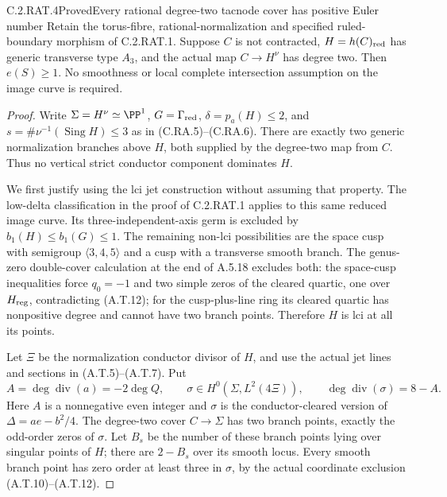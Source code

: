 \begin{statement}{C.2.RAT.4}{Proved}{Every rational degree-two tacnode cover has positive Euler number}
Retain the torus-fibre, rational-normalization and specified
ruled-boundary morphism of C.2.RAT.1. Suppose $C$ is not
contracted, $H=h(C)_{\rm red}$ has generic transverse type
$A_3$, and the actual map $C\to H^\nu$ has degree two.
Then $e(S)\ge1$. No smoothness or local complete intersection
assumption on the image curve is required.
\end{statement}
\begin{proof}
Write $\Sigma=H^\nu\simeq\PP^1$, $G=\Gamma_{\rm red}$,
$\delta=p_a(H)\le2$, and
$s=\#\nu^{-1}(\operatorname{Sing}H)\le3$ as in
(C.RA.5)--(C.RA.6). There are exactly two generic
normalization branches above $H$, both supplied by the
degree-two map from $C$. Thus no vertical strict conductor
component dominates $H$.

We first justify using the lci jet construction without
assuming that property. The low-delta classification in the
proof of C.2.RAT.1 applies to this same reduced image curve.
Its three-independent-axis germ is excluded by
$b_1(H)\le b_1(G)\le1$. The remaining non-lci possibilities
are the space cusp with semigroup $\langle3,4,5\rangle$
and a cusp with a transverse smooth branch. The
genus-zero double-cover calculation at the end of A.5.18
excludes both: the space-cusp inequalities force
$q_0=-1$ and two simple zeros of the cleared quartic,
one over $H_{\rm reg}$, contradicting (A.T.12); for the
cusp-plus-line ring its cleared quartic has nonpositive
degree and cannot have two branch points. Therefore $H$
is lci at all its points.

Let $\Xi$ be the normalization conductor divisor of $H$,
and use the actual jet lines and sections in
(A.T.5)--(A.T.7). Put
\[
 A=\deg\operatorname{div}(a)=-2\deg Q,\qquad
 \sigma\in H^0(\Sigma,L^2(4\Xi)),\qquad
 \deg\operatorname{div}(\sigma)=8-A.
\tag{C.RA.26}
\]
Here $A$ is a nonnegative even integer and $\sigma$ is
the conductor-cleared version of $\Delta=ae-b^2/4$.
The degree-two cover $C\to\Sigma$ has two branch points,
exactly the odd-order zeros of $\sigma$. Let $B_s$ be
the number of these branch points lying over singular
points of $H$; there are $2-B_s$ over its smooth locus.
Every smooth branch point has zero order at least three
in $\sigma$, by the actual coordinate exclusion
(A.T.10)--(A.T.12).


\end{proof}
